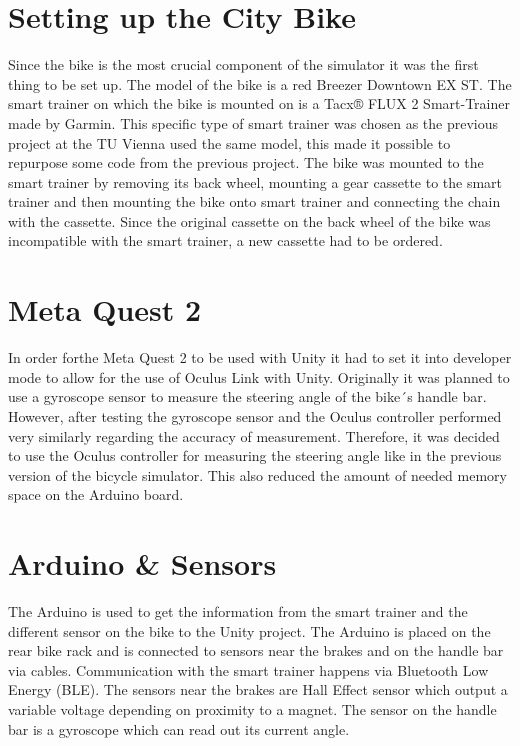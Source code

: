 \documentclass[english,notitlepage,smartquotes]{hgbreport}
\begin{document}
\section{Setting up the City Bike}
Since the bike is the most crucial component of the simulator it was the first thing to be set up. The model of the bike is a red Breezer Downtown EX ST. The smart trainer on which the bike is mounted on is a Tacx® FLUX 2 Smart-Trainer made by Garmin. 
This specific type of smart trainer was chosen as the previous project at the TU Vienna used the same model, this made it possible to repurpose some code from the previous project.
The bike was mounted to the smart trainer by removing its back wheel, mounting a gear cassette to the smart trainer and then mounting the bike onto smart trainer and connecting the chain with the cassette. Since the original cassette on the back wheel of the bike was incompatible with the smart trainer, a new cassette had to be ordered.  

\section{Meta Quest 2}
In order forthe Meta Quest 2 to be used with Unity it had to set it into developer mode to allow for the use of Oculus Link with Unity.
Originally it was planned to use a gyroscope sensor to measure the steering angle of the bike´s handle bar.
However, after testing the gyroscope sensor and the Oculus controller performed very similarly regarding the accuracy of measurement. Therefore, it was decided to use the Oculus controller for measuring the steering angle like in the previous version of the bicycle simulator. This also reduced the amount of needed memory space on the Arduino board.

\section{Arduino \& Sensors}
\label{secArduino}
The Arduino is used to get the information from the smart trainer and the different sensor on the bike to the Unity project. The Arduino is placed on the rear bike rack and is connected to sensors near the brakes and on the handle bar via cables. Communication with the smart trainer happens via Bluetooth Low Energy (BLE). The sensors near the brakes are Hall Effect sensor which output a variable voltage depending on proximity to a magnet. The sensor on the handle bar is a gyroscope which can read out its current angle. 
\end{document}
